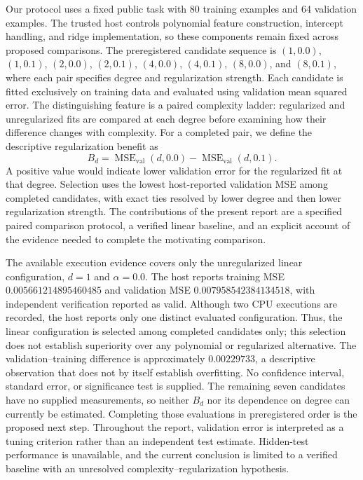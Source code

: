 \documentclass[11pt]{article}
\begin{document}
Our protocol uses a fixed public task with 80 training examples and 64 validation examples. The trusted host controls polynomial feature construction, intercept handling, and ridge implementation, so these components remain fixed across proposed comparisons. The preregistered candidate sequence is \((1,0.0)\), \((1,0.1)\), \((2,0.0)\), \((2,0.1)\), \((4,0.0)\), \((4,0.1)\), \((8,0.0)\), and \((8,0.1)\), where each pair specifies degree and regularization strength. Each candidate is fitted exclusively on training data and evaluated using validation mean squared error. The distinguishing feature is a paired complexity ladder: regularized and unregularized fits are compared at each degree before examining how their difference changes with complexity. For a completed pair, we define the descriptive regularization benefit as
\[
B_d =
\operatorname{MSE}_{\mathrm{val}}(d,0.0)
-
\operatorname{MSE}_{\mathrm{val}}(d,0.1).
\]
A positive value would indicate lower validation error for the regularized fit at that degree. Selection uses the lowest host-reported validation MSE among completed candidates, with exact ties resolved by lower degree and then lower regularization strength. The contributions of the present report are a specified paired comparison protocol, a verified linear baseline, and an explicit account of the evidence needed to complete the motivating comparison.

The available execution evidence covers only the unregularized linear configuration, \(d=1\) and \(\alpha=0.0\). The host reports training MSE \(0.005661214895460485\) and validation MSE \(0.007958542384134518\), with independent verification reported as valid. Although two CPU executions are recorded, the host reports only one distinct evaluated configuration. Thus, the linear configuration is selected among completed candidates only; this selection does not establish superiority over any polynomial or regularized alternative. The validation--training difference is approximately \(0.00229733\), a descriptive observation that does not by itself establish overfitting. No confidence interval, standard error, or significance test is supplied. The remaining seven candidates have no supplied measurements, so neither \(B_d\) nor its dependence on degree can currently be estimated. Completing those evaluations in preregistered order is the proposed next step. Throughout the report, validation error is interpreted as a tuning criterion rather than an independent test estimate. Hidden-test performance is unavailable, and the current conclusion is limited to a verified baseline with an unresolved complexity--regularization hypothesis.
\end{document}
